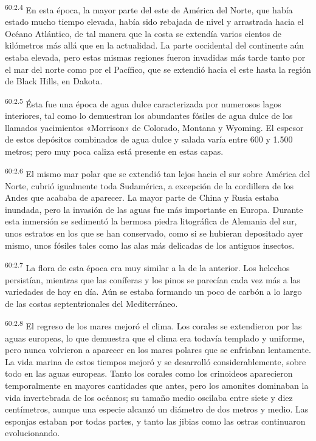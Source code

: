 \par
\textsuperscript{60:2.4} En esta época, la mayor parte del este de América del Norte, que había estado mucho tiempo elevada, había sido rebajada de nivel y arrastrada hacia el Océano Atlántico, de tal manera que la costa se extendía varios cientos de kilómetros más allá que en la actualidad. La parte occidental del continente aún estaba elevada, pero estas mismas regiones fueron invadidas más tarde tanto por el mar del norte como por el Pacífico, que se extendió hacia el este hasta la región de Black Hills, en Dakota.

\par
\textsuperscript{60:2.5} Ésta fue una época de agua dulce caracterizada por numerosos lagos interiores, tal como lo demuestran los abundantes fósiles de agua dulce de los llamados yacimientos «Morrison» de Colorado, Montana y Wyoming. El espesor de estos depósitos combinados de agua dulce y salada varía entre 600 y 1.500 metros; pero muy poca caliza está presente en estas capas.

\par
\textsuperscript{60:2.6} El mismo mar polar que se extendió tan lejos hacia el sur sobre América del Norte, cubrió igualmente toda Sudamérica, a excepción de la cordillera de los Andes que acababa de aparecer. La mayor parte de China y Rusia estaba inundada, pero la invasión de las aguas fue más importante en Europa. Durante esta inmersión se sedimentó la hermosa piedra litográfica de Alemania del sur, unos estratos en los que se han conservado, como si se hubieran depositado ayer mismo, unos fósiles tales como las alas más delicadas de los antiguos insectos.

\par
\textsuperscript{60:2.7} La flora de esta época era muy similar a la de la anterior. Los helechos persistían, mientras que las coníferas y los pinos se parecían cada vez más a las variedades de hoy en día. Aún se estaba formando un poco de carbón a lo largo de las costas septentrionales del Mediterráneo.

\par
\textsuperscript{60:2.8} El regreso de los mares mejoró el clima. Los corales se extendieron por las aguas europeas, lo que demuestra que el clima era todavía templado y uniforme, pero nunca volvieron a aparecer en los mares polares que se enfriaban lentamente. La vida marina de estos tiempos mejoró y se desarrolló considerablemente, sobre todo en las aguas europeas. Tanto los corales como los crinoideos aparecieron temporalmente en mayores cantidades que antes, pero los amonites dominaban la vida invertebrada de los océanos; su tamaño medio oscilaba entre siete y diez centímetros, aunque una especie alcanzó un diámetro de dos metros y medio. Las esponjas estaban por todas partes, y tanto las jibias como las ostras continuaron evolucionando.

